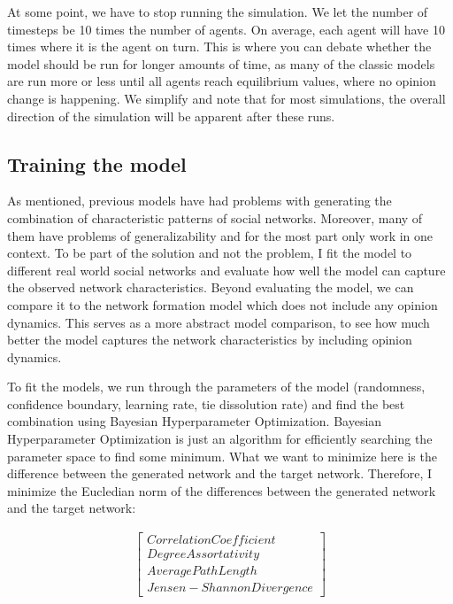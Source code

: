 \documentclass[9pt,twocolumn,twoside]{ilcss}
\begin{document}
At some point, we have to stop running the simulation. We let the number of timesteps be 10 times the number of agents. On average, each agent will have 10 times where it is the agent on turn. 
This is where you can debate whether the model should be run for longer amounts of time, as many of the classic models are run more or less until all agents reach equilibrium values, where no opinion change is happening. We simplify and note that for most simulations, the overall direction of the simulation will be apparent after these runs.

\subsection{Training the model}

As mentioned, previous models have had problems with generating the combination of characteristic patterns of social networks. Moreover, many of them have problems of generalizability and for the most part only work in one context. 
To be part of the solution and not the problem, I fit the model to different real world social networks and evaluate how well the model can capture the observed network characteristics.
Beyond evaluating the model, we can compare it to the network formation model which does not include any opinion dynamics. This serves as a more abstract model comparison, to see how much better the model captures the network characteristics by including opinion dynamics. 

To fit the models, we run through the parameters of the model (randomness, confidence boundary, learning rate, tie dissolution rate) and find the best combination using Bayesian Hyperparameter Optimization.
Bayesian Hyperparameter Optimization is just an algorithm for efficiently searching the parameter space to find some minimum. What we want to minimize here is the difference between the generated network and the target network. 
Therefore, I minimize the Eucledian norm of the differences between the generated network and the target network:

\begin{figure}[h]
	\begin{align*}
	\begin{bmatrix}
		Correlation Coefficient \\
		Degree Assortativity \\
		Average Path Length \\
		Jensen-Shannon Divergence
	  \end{bmatrix}
	\end{align*}
\end{figure}
\end{document}
